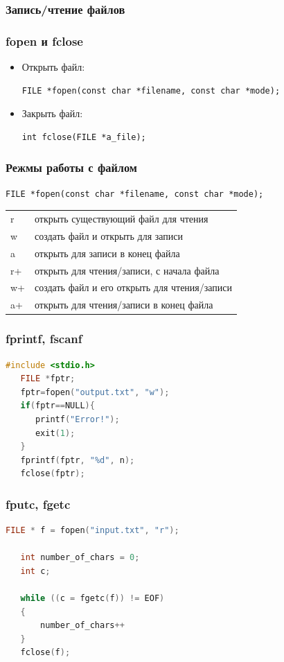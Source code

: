 \documentclass[12pt,pdf,hyperref={unicode}]{beamer}
\begin{document}
\begin{frame}[fragile]
\frametitle{Запись/чтение файлов} 
\frametitle{fopen и fclose} 
\begin{itemize}
\item Открыть файл:
\begin{lstlisting}
FILE *fopen(const char *filename, const char *mode);
\end{lstlisting}
\item Закрыть файл:
\begin{lstlisting}
int fclose(FILE *a_file);
\end{lstlisting}
\end{itemize}
\end{frame}

\begin{frame}[fragile]
\frametitle{Режмы работы с файлом} 
\begin{lstlisting}
FILE *fopen(const char *filename, const char *mode);
\end{lstlisting}
\begin{tabular}{ l || l }
  r & открыть существующий файл для чтения \\
  w & создать файл и открыть для записи \\
  a & открыть для записи в конец файла \\
  r+ & открыть для чтения/записи, с начала файла  \\
  w+ & создать файл и его открыть для чтения/записи \\
  a+ & открыть для чтения/записи в конец файла \\
\end{tabular}
\end{frame}

\begin{frame}[fragile]
\frametitle{fprintf, fscanf}  
\begin{lstlisting}[language=C++,basicstyle=\ttfamily,keywordstyle=\color{blue},
                stringstyle=\color{orange}\ttfamily]
   #include <stdio.h>
   FILE *fptr;
   fptr=fopen("output.txt", "w");
   if(fptr==NULL){
      printf("Error!");   
      exit(1);             
   }
   fprintf(fptr, "%d", n);   
   fclose(fptr);
\end{lstlisting}
\end{frame}


\begin{frame}[fragile]
\frametitle{fputc, fgetc}  
\begin{lstlisting}[language=C++,basicstyle=\ttfamily,keywordstyle=\color{blue},stringstyle=\color{orange}\ttfamily]
   FILE * f = fopen("input.txt", "r");
   
   int number_of_chars = 0;
   int c;
   
   while ((c = fgetc(f)) != EOF)
   {
       number_of_chars++
   }
   fclose(f);
\end{lstlisting}
\end{frame}
\end{document}
